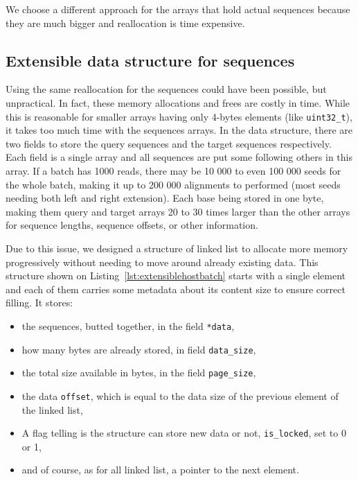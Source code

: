 We choose a different approach for the arrays that hold actual sequences because they are much bigger and reallocation is time expensive.

\subsection{Extensible data structure for sequences}

Using the same reallocation for the sequences could have been possible, but unpractical. In fact, these memory allocations and frees are costly in time. While this is reasonable for smaller arrays having only 4-bytes elements (like \verb|uint32_t|), it takes too much time with the sequences arrays. In the data structure, there are two fields to store the query sequences and the target sequences respectively. Each field is a single array and all sequences are put some following others in this array. If a batch has 1000 reads, there may be 10 000 to even 100 000 seeds for the whole batch, making it up to 200 000 alignments to performed (most seeds needing both left and right extension). Each base being stored in one byte, making them query and target arrays 20 to 30 times larger than the other arrays for sequence lengths, sequence offsets, or other information.

Due to this issue, we designed a structure of linked list to allocate more memory progressively without needing to move around already existing data. This structure shown on Listing~\ref{lst:extensiblehostbatch} starts with a single element and each of them carries some metadata about its content size to ensure correct filling. It stores:

\begin{itemize}
	\item the sequences, butted together, in the field \verb|*data|,
	\item how many bytes are already stored, in field \verb|data_size|,
	\item the total size available in bytes, in the field \verb|page_size|,
	\item the data \verb|offset|, which is equal to the data size of the previous element of the linked list,
	\item A flag telling is the structure can store new data or not, \verb|is_locked|, set to 0 or 1,
	\item and of course, as for all linked list, a pointer to the next element.
\end{itemize}


